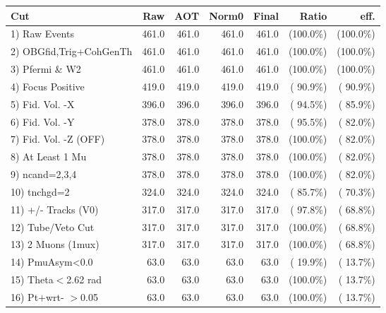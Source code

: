  \begin{table}[h!]\centering
 \begin{tabular}{||l||r|r|r|r|r|r||}
 \hline
 \hline
 Cut & Raw & AOT & Norm0 & Final & Ratio & eff.       \\
 \hline
  1) Raw Events           &        461.0 &        461.0 &        461.0 &        461.0 & (100.0\%) & (100.0\%) \\
  2) OBGfid,Trig+CohGenTh &        461.0 &        461.0 &        461.0 &        461.0 & (100.0\%) & (100.0\%) \\
  3) Pfermi \& W2         &        461.0 &        461.0 &        461.0 &        461.0 & (100.0\%) & (100.0\%) \\
  4) Focus Positive       &        419.0 &        419.0 &        419.0 &        419.0 & ( 90.9\%) & ( 90.9\%) \\
  5) Fid. Vol. -X         &        396.0 &        396.0 &        396.0 &        396.0 & ( 94.5\%) & ( 85.9\%) \\
  6) Fid. Vol. -Y         &        378.0 &        378.0 &        378.0 &        378.0 & ( 95.5\%) & ( 82.0\%) \\
  7) Fid. Vol. -Z (OFF)   &        378.0 &        378.0 &        378.0 &        378.0 & (100.0\%) & ( 82.0\%) \\
  8) At Least 1 Mu        &        378.0 &        378.0 &        378.0 &        378.0 & (100.0\%) & ( 82.0\%) \\
  9) ncand=2,3,4          &        378.0 &        378.0 &        378.0 &        378.0 & (100.0\%) & ( 82.0\%) \\
 10) tnchgd=2             &        324.0 &        324.0 &        324.0 &        324.0 & ( 85.7\%) & ( 70.3\%) \\
 11) +/- Tracks (V0)      &        317.0 &        317.0 &        317.0 &        317.0 & ( 97.8\%) & ( 68.8\%) \\
 12) Tube/Veto Cut        &        317.0 &        317.0 &        317.0 &        317.0 & (100.0\%) & ( 68.8\%) \\
 13) 2 Muons (1mux)       &        317.0 &        317.0 &        317.0 &        317.0 & (100.0\%) & ( 68.8\%) \\
 14) PmuAsym<0.0          &         63.0 &         63.0 &         63.0 &         63.0 & ( 19.9\%) & ( 13.7\%) \\
 15) Theta$<$2.62 rad     &         63.0 &         63.0 &         63.0 &         63.0 & (100.0\%) & ( 13.7\%) \\
 16) Pt+wrt- $>$0.05      &         63.0 &         63.0 &         63.0 &         63.0 & (100.0\%) & ( 13.7\%) \\

\end{tabular}
\end{table}
